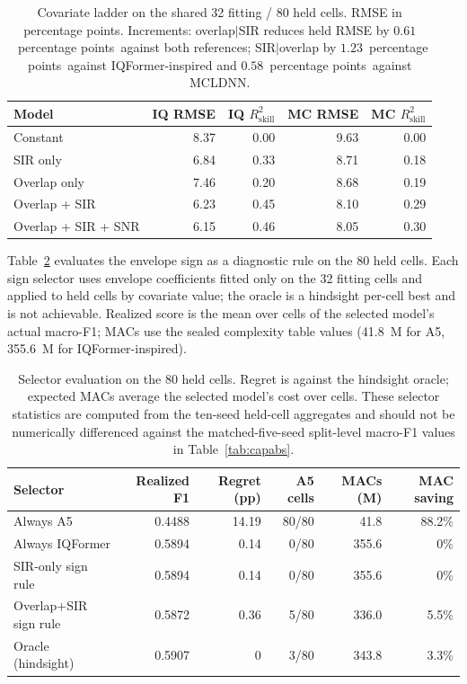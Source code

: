\documentclass[letterpaper,onecolumn,11pt,journal]{IEEEtran}
\newcommand{\pp}{percentage points}
\begin{document}
\begin{table}[t]
\centering
\caption{Covariate ladder on the shared 32 fitting / 80 held cells. RMSE in
\pp. Increments: overlap$|$SIR reduces held RMSE by $0.61$~\pp\ against both
references; SIR$|$overlap by $1.23$~\pp\ against IQFormer-inspired and
$0.58$~\pp\ against MCLDNN.}
\label{tab:ladder}
\footnotesize
\setlength{\tabcolsep}{4pt}
\begin{tabular}{lrrrr}
\toprule
Model & IQ RMSE & IQ $R^2_{\mathrm{skill}}$ & MC RMSE & MC $R^2_{\mathrm{skill}}$\\
\midrule
Constant & 8.37 & 0.00 & 9.63 & 0.00\\
SIR only & 6.84 & 0.33 & 8.71 & 0.18\\
Overlap only & 7.46 & 0.20 & 8.68 & 0.19\\
Overlap + SIR & 6.23 & 0.45 & 8.10 & 0.29\\
Overlap + SIR + SNR & 6.15 & 0.46 & 8.05 & 0.30\\
\bottomrule
\end{tabular}
\end{table}

Table~\ref{tab:selector} evaluates the envelope sign as a diagnostic rule on
the 80 held cells. Each sign selector uses envelope coefficients fitted only
on the 32 fitting cells and applied to held cells by covariate value; the
oracle is a hindsight per-cell best and is not achievable. Realized score is
the mean over cells of the selected model's actual macro-F1; MACs use the
sealed complexity table values (41.8~M for A5, 355.6~M for IQFormer-inspired).

\begin{table}[t]
\centering
\caption{Selector evaluation on the 80 held cells. Regret is against the
hindsight oracle; expected MACs average the selected model's cost over cells.
These selector statistics are computed from the ten-seed held-cell aggregates
and should not be numerically differenced against the matched-five-seed
split-level macro-F1 values in Table~\ref{tab:capabs}.}
\label{tab:selector}
\footnotesize
\setlength{\tabcolsep}{3pt}
\begin{tabular}{lrrrrr}
\toprule
Selector & Realized F1 & Regret (pp) & A5 cells & MACs (M) & MAC saving\\
\midrule
Always A5 & 0.4488 & 14.19 & 80/80 & 41.8 & 88.2\%\\
Always IQFormer & 0.5894 & 0.14 & 0/80 & 355.6 & 0\%\\
SIR-only sign rule & 0.5894 & 0.14 & 0/80 & 355.6 & 0\%\\
Overlap+SIR sign rule & 0.5872 & 0.36 & 5/80 & 336.0 & 5.5\%\\
Oracle (hindsight) & 0.5907 & 0 & 3/80 & 343.8 & 3.3\%\\
\bottomrule
\end{tabular}
\end{table}
\end{document}
